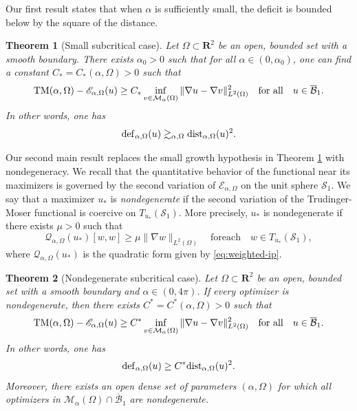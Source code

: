 \documentclass[reqno,11pt]{amsart}
\newtheorem{theorem}{Theorem}
\theoremstyle{definition}
\newcommand{\R}{\mathbf{R}}
\begin{document}
Our first result states that when $\alpha$ is sufficiently small, the deficit 
is bounded below by the square of the distance. 
\begin{theorem}[Small subcritical case] \label{thm:subcritical_stability} 
Let $\Omega \subset \R^2$ be an open, bounded set with a smooth boundary.
There exists $\alpha_0>0$ such that for all $\alpha \in (0,\alpha_0)$, one can find 
a constant $C_*=C_*({\alpha},\Omega)>0$ such that 
\begin{equation*}
{\rm TM}({\alpha},\Omega) - \mathscr{E}_{\alpha, \Omega} (u) \geq  C_* \inf_{v \in 
\mathcal{M}_\alpha(\Omega)} {\| \nabla u - \nabla v \|_{L^2(\Omega)}^2} 
\quad {\rm for \ all} \quad u\in \overline{\mathcal{B}}_1.
\end{equation*} 
In other words, one has
\[
{\rm def}_{\alpha,\Omega}(u)\gtrsim_{\alpha,\Omega}{\rm dist}_{\alpha,\Omega}(u)^2.
\]
\end{theorem} 

Our second main result replaces the small growth hypothesis in Theorem \ref{thm:subcritical_stability} 
with nondegeneracy.  
We recall that the quantitative behavior of the functional near its maximizers 
is governed by the second variation of $\mathscr{E}_{\alpha,\Omega}$ on the unit sphere 
$\mathcal{S}_1$. We say that a maximizer $u_*$ is \emph{nondegenerate} if the second 
variation of the Trudinger-Moser functional is coercive on $T_{u_*} (\mathcal{S}_1)$. 
More precisely, $u_*$ is nondegenerate if there exists $\mu>0$ such that 
$$\mathscr{Q}_{\alpha, \Omega}(u_*)[w,w] \geq \mu \| \nabla w \|_{L^2(\Omega)} 
\quad \mathrm{for each}\quad w \in T_{u_*}(\mathcal{S}_1),$$
where $\mathscr{Q}_{\alpha,\Omega}(u_*)$ is the quadratic form given by \eqref{eq:weighted-ip}.
\begin{theorem}[Nondegenerate subcritical case]\label{thm:subcritical_stability_nondeg}
Let $\Omega \subset \R^2$ be an open, bounded set with a smooth boundary and $\alpha\in(0,4\pi)$.
If every optimizer is nondegenerate, then there exists $C^*=C^*(\alpha,\Omega)>0$ such that
\[
{\rm TM}({\alpha},\Omega) - \mathscr{E}_{\alpha, \Omega} (u) \geq  C^*\inf_{v \in
\mathcal{M}_\alpha(\Omega)} {\| \nabla u - \nabla v \|_{L^2(\Omega)}^{2}} \quad 
{\rm for \ all} \quad u\in\overline{\mathcal{B}}_1.
\]
In other words, one has
\[
{\rm def}_{\alpha,\Omega}(u) \geq C^*{\rm dist}_{\alpha,\Omega}(u)^{2}.
\]
Moreover, there exists an open dense set of parameters $(\alpha,\Omega)$ for which 
all optimizers in $\mathcal{M}_\alpha(\Omega)\cap\overline{\mathcal{B}}_1$ are nondegenerate.
\end{theorem}
\end{document}
